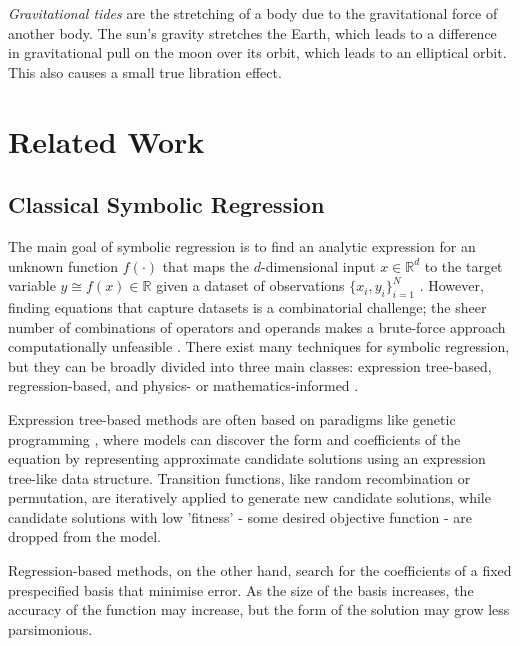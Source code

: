 \documentclass[fleqn,10pt]{olplainarticle}
\numberwithin{equation}{subsection}
\begin{document}
\emph{Gravitational tides} are the stretching of a body due to the gravitational force of another body. The sun's gravity stretches the Earth, which leads to a difference in gravitational pull on the moon over its orbit, which leads to an elliptical orbit. This also causes a small true libration effect.

\section{Related Work}
\subsection{Classical Symbolic Regression}
The main goal of symbolic regression is to find an analytic expression for an unknown function $f(\cdot)$ that maps the $d$-dimensional input $x \in \mathbb{R}^d$ to the target variable $y \cong f(x) \in \mathbb{R}$ given a dataset of observations $\{x_i, y_i\}_{i=1}^{N}$ \cite{makke2023interpretablescientificdiscoverysymbolic}. However, finding equations that capture datasets is a combinatorial challenge; the sheer number of combinations of operators and operands makes a brute-force approach computationally unfeasible \cite{Karniadakis}. There exist many techniques for symbolic regression, but they can be broadly divided into three main classes: expression tree-based, regression-based, and physics- or mathematics-informed \cite{makke2023interpretablescientificdiscoverysymbolic}.

Expression tree-based methods are often based on paradigms like genetic programming \cite{makke2023interpretablescientificdiscoverysymbolic}, where models can discover the form and coefficients of the equation by representing approximate candidate solutions using an expression tree-like data structure. Transition functions, like random recombination or permutation, are iteratively applied to generate new candidate solutions, while candidate solutions with low 'fitness' - some desired objective function - are dropped from the model.\cite{oh2023geneticprogrammingbasedsymbolic}

Regression-based methods, on the other hand, search for the coefficients of a fixed prespecified basis that minimise error. As the size of the basis increases, the accuracy of the function may increase, but the form of the solution may grow less parsimonious.\cite{makke2023interpretablescientificdiscoverysymbolic}
\end{document}

